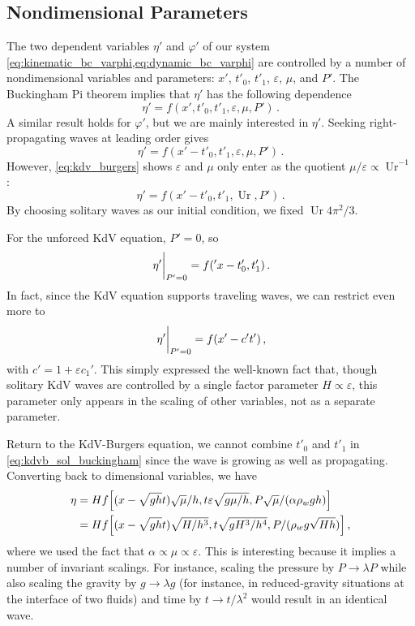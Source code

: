 \documentclass{jfm}
\DeclareMathOperator{\Ur}{Ur}
\renewcommand*{\epsilon}{\varepsilon}
\begin{document}
\subsection{Nondimensional Parameters}
The two dependent variables $\eta'$ and $\varphi'$ of our system
\cref{eq:kinematic_bc_varphi,eq:dynamic_bc_varphi} are controlled by a
number of nondimensional variables and parameters: $x'$, $t'_0$, $t'_1$,
$\epsilon$, $\mu$, and $P'$.
The Buckingham Pi theorem implies that $\eta'$ has the following
dependence
\begin{equation}
  \eta' = f(x', t'_0, t'_1, \epsilon, \mu, P') \,.
\end{equation}
A similar result holds for $\varphi'$, but we are mainly interested in
$\eta'$.
Seeking right-propagating waves at leading order gives
\begin{equation}
  \eta' = f(x'-t'_0, t'_1, \epsilon, \mu, P') \,.
\end{equation}
However, \cref{eq:kdv_burgers} shows $\epsilon$ and $\mu$ only enter as
the quotient $\mu/\epsilon \propto \Ur^{-1}$:
\begin{equation}
  \eta' = f(x'-t'_0, t'_1, \Ur, P') \,.
  \label{eq:kdvb_sol_buckingham}
\end{equation}
By choosing solitary waves as our initial condition, we fixed $\Ur
4\pi^2/3$.

For the unforced KdV equation, $P'=0$, so
\begin{equation}
  \eval{\eta'}_{P'=0} = f('x - t'_0, t'_1) \,.
\end{equation}
In fact, since the KdV equation supports traveling waves, we can
restrict even more to
\begin{equation}
  \eval{\eta'}_{P'=0} = f(x'-c' t') \,,
\end{equation}
with $c' = 1 + \epsilon c_1'$.
This simply expressed the well-known fact that, though solitary KdV
waves are controlled by a single factor parameter $H \propto \epsilon$,
this parameter only appears in the scaling of other variables, \ie not
as a separate parameter.

Return to the KdV-Burgers equation, we cannot combine $t'_0$ and $t'_1$
in \cref{eq:kdvb_sol_buckingham} since the wave is growing as well as
propagating.
Converting back to dimensional variables, we have
\begin{equation}
  \begin{split}
    \eta &= H f\bqty{(x - \sqrt{gh} t) \sqrt{\mu}/h, t \epsilon \sqrt{g
      \mu/h}, P \sqrt{\mu}/(\alpha \rho_w g h)} \\
    &= H f\bqty{(x - \sqrt{gh}t) \sqrt{H/h^3}, t \sqrt{g H^3/h^4}, P /(\rho_w
      g \sqrt{H h})} \,,
  \end{split}
\end{equation}
where we used the fact that $\alpha \propto \mu \propto \epsilon$.
This is interesting because it implies a number of invariant scalings.
For instance, scaling the pressure by $P \to \lambda P$ while also
scaling the gravity by $g \to \lambda g$ (for instance, in
reduced-gravity situations at the interface of two fluids) and time by
$t \to t/\lambda^2$ would result in an identical wave.
\end{document}
